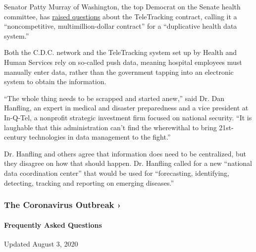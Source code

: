 Senator Patty Murray of Washington, the top Democrat on the Senate
health committee, has
\href{https://www.help.senate.gov/ranking/newsroom/press/murray-demands-answers-regarding-non-competitive-multimillion-dollar-contract-for-duplicative-health-data-system-}{raised
questions} about the TeleTracking contract, calling it a
``noncompetitive, multimillion-dollar contract'' for a ``duplicative
health data system.''

Both the C.D.C. network and the TeleTracking system set up by Health and
Human Services rely on so-called push data, meaning hospital employees
must manually enter data, rather than the government tapping into an
electronic system to obtain the information.

``The whole thing needs to be scrapped and started anew,'' said Dr. Dan
Hanfling, an expert in medical and disaster preparedness and a vice
president at In-Q-Tel, a nonprofit strategic investment firm focused on
national security. ``It is laughable that this administration can't find
the wherewithal to bring 21st-century technologies in data management to
the fight.''

Dr. Hanfling and others agree that information does need to be
centralized, but they disagree on how that should happen. Dr. Hanfling
called for a new ``national data coordination center'' that would be
used for ``forecasting, identifying, detecting, tracking and reporting
on emerging diseases.''

\href{https://www.nytimes3xbfgragh.onion/news-event/coronavirus?action=click\&pgtype=Article\&state=default\&region=MAIN_CONTENT_3\&context=storylines_faq}{}

\hypertarget{the-coronavirus-outbreak-}{%
\subsubsection{The Coronavirus Outbreak
›}\label{the-coronavirus-outbreak-}}

\hypertarget{frequently-asked-questions}{%
\paragraph{Frequently Asked
Questions}\label{frequently-asked-questions}}

Updated August 3, 2020

